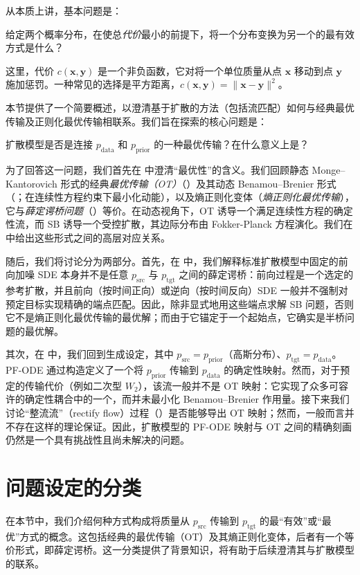 从本质上讲，基本问题是：
\begin{question}
    给定两个概率分布，在使总\emph{代价}最小的前提下，将一个分布变换为另一个的最有效方式是什么？
\end{question}
这里，代价 $ c(\mathbf{x}, \mathbf{y}) $ 是一个非负函数，它对将一个单位质量从点 $ \mathbf{x}  $ 移动到点 $ \mathbf{y}$ 施加惩罚。一种常见的选择是平方距离，$c(\mathbf{x}, \mathbf{y}) = \|\mathbf{x} - \mathbf{y}\|^2$。

本节提供了一个简要概述，以澄清基于扩散的方法（包括流匹配）如何与经典最优传输及正则化最优传输相联系。我们旨在探索的核心问题是：
\begin{question}
    扩散模型是否是连接 $p_{\text{data}}$ 和 $p_{\text{prior}}$ 的一种最优传输？在什么意义上是？
\end{question}


为了回答这一问题，我们首先在  中澄清“最优性”的含义。我们回顾静态 Monge--Kantorovich 形式的经典\emph{最优传输（OT）}（）及其动态 Benamou--Brenier 形式（；在连续性方程约束下最小化动能），以及熵正则化变体（\emph{熵正则化最优传输}），它与\emph{薛定谔桥问题}（）等价。在动态视角下，OT 诱导一个满足连续性方程的确定性流，而 SB 诱导一个受控扩散，其边际分布由 Fokker-Planck 方程演化。我们在  中给出这些形式之间的高层对应关系。

随后，我们将讨论分为两部分。首先，在  中，我们解释标准扩散模型中固定的前向加噪 SDE 本身并不是任意 $p_{\mathrm{src}}$ 与 $p_{\mathrm{tgt}}$ 之间的薛定谔桥：前向过程是一个选定的参考扩散，并且前向（按时间正向）或逆向（按时间反向）SDE 一般并不强制对预定目标实现精确的端点匹配。因此，除非显式地用这些端点求解 SB 问题，否则它不是熵正则化最优传输的最优解；而由于它锚定于一个起始点，它确实是半桥问题的最优解。

其次，在  中，我们回到生成设定，其中 $p_{\mathrm{src}}=p_{\mathrm{prior}}$（高斯分布）、$p_{\mathrm{tgt}}=p_{\mathrm{data}}$。PF-ODE 通过构造定义了一个将 $p_{\mathrm{prior}}$ 传输到 $p_{\mathrm{data}}$ 的确定性映射。然而，对于预定的传输代价（例如二次型 $W_2$），该流一般并不是 OT 映射：它实现了众多可容许的确定性耦合中的一个，而并未最小化 Benamou–Brenier 作用量。接下来我们讨论“整流流”（rectify flow）过程（）是否能够导出 OT 映射；然而，一般而言并不存在这样的理论保证。因此，扩散模型的 PF-ODE 映射与 OT 之间的精确刻画仍然是一个具有挑战性且尚未解决的问题。


\newpage
\section{问题设定的分类}\label{sec:ot-intro} 
在本节中，我们介绍何种方式构成将质量从 $p_{\mathrm{src}}$ 传输到 $p_{\mathrm{tgt}}$ 的最“有效”或“最优”方式的概念。这包括经典的最优传输（OT）及其熵正则化变体，后者有一个等价形式，即薛定谔桥。这一分类提供了背景知识，将有助于后续澄清其与扩散模型的联系。




